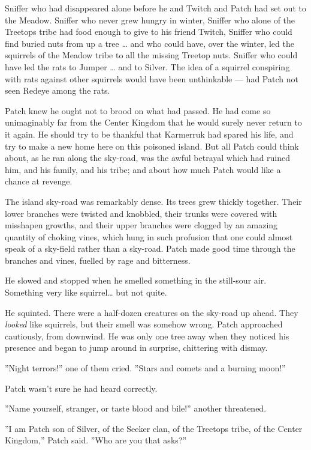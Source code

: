 \documentclass[12pt]{book}
\begin{document}
Sniffer who had disappeared alone before he and Twitch and Patch had
set out to the Meadow. Sniffer who never grew hungry in winter,
Sniffer who alone of the Treetops tribe had food enough to give to his
friend Twitch, Sniffer who could find buried nuts from up a tree
\ldots{} and who could have, over the winter, led the squirrels of the
Meadow tribe to all the missing Treetop nuts. Sniffer who could have
led the rats to Jumper \ldots{} and to Silver. The idea of a squirrel
conspiring with rats against other squirrels would have been
unthinkable --- had Patch not seen Redeye among the rats.

Patch knew he ought not to brood on what had passed. He had come so
unimaginably far from the Center Kingdom that he would surely never
return to it again. He should try to be thankful that Karmerruk had
spared his life, and try to make a new home here on this poisoned
island. But all Patch could think about, as he ran along the sky-road,
was the awful betrayal which had ruined him, and his family, and his
tribe; and about how much Patch would like a chance at revenge.

The island sky-road was remarkably dense. Its trees grew thickly
together. Their lower branches were twisted and knobbled, their trunks
were covered with misshapen growths, and their upper branches were
clogged by an amazing quantity of choking vines, which hung in such
profusion that one could almost speak of a sky-field rather than a
sky-road. Patch made good time through the branches and vines, fuelled
by rage and bitterness.

He slowed and stopped when he smelled something in the still-sour
air. Something very like squirrel\ldots{} but not quite.

He squinted. There were a half-dozen creatures on the sky-road up
ahead. They \textit{looked} like squirrels, but their smell was
somehow wrong. Patch approached cautiously, from downwind. He was only
one tree away when they noticed his presence and began to jump around
in surprise, chittering with dismay.

''Night terrors!'' one of them cried. ''Stars and comets and a burning
moon!''

Patch wasn't sure he had heard correctly.

''Name yourself, stranger, or taste blood and bile!'' another
threatened.

''I am Patch son of Silver, of the Seeker clan, of the Treetops tribe,
of the Center Kingdom,'' Patch said. ''Who are you that asks?''
\end{document}
